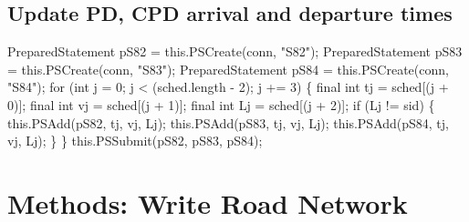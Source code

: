 \subsection{Update PD, CPD arrival and departure times}
\nwenddocs{}\endmoddef{}
PreparedStatement pS82 = this.PSCreate(conn, "S82");
PreparedStatement pS83 = this.PSCreate(conn, "S83");
PreparedStatement pS84 = this.PSCreate(conn, "S84");
for (int j = 0; j < (sched.length - 2); j += 3) \{
  final int tj = sched[(j + 0)];
  final int vj = sched[(j + 1)];
  final int Lj = sched[(j + 2)];
  if (Lj != sid) \{
    this.PSAdd(pS82, tj, vj, Lj);
    this.PSAdd(pS83, tj, vj, Lj);
    this.PSAdd(pS84, tj, vj, Lj);
  \}
\}
this.PSSubmit(pS82, pS83, pS84);
\nwendcode{}\nwdocspar

\section{Methods: Write Road Network}

